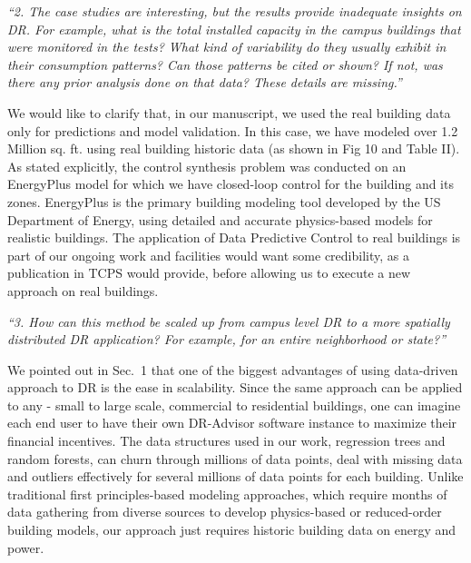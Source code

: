 \documentclass[11pt]{article}
\begin{document}
\vspace*{0.5cm}
\noindent \emph{``2. The case studies are interesting, but the results provide inadequate insights on DR. For example, what is the total installed capacity in the campus buildings that were monitored in the tests? What kind of variability do they usually exhibit in their consumption patterns? Can those patterns be cited or shown? If not, was there any prior analysis done on that data? These details are missing.''}

\color{blue}
\vspace*{0.25cm}
\noindent We would like to clarify that, in our manuscript, we used the real building data only for predictions and model validation. In this case, we have modeled over 1.2 Million sq. ft. using real building historic data (as shown in Fig 10 and Table II). As stated explicitly, the control synthesis problem was conducted on an EnergyPlus model for which we have closed-loop control for the building and its zones. EnergyPlus is the primary building modeling tool developed by the US Department of Energy, using detailed and accurate physics-based models for realistic buildings. The application of Data Predictive Control to real buildings is part of our ongoing work and facilities would want some credibility, as a publication in TCPS would provide, before allowing us to execute a new approach on real buildings. 
\color{black}

\vspace*{0.5cm}
\noindent \emph{``3. How can this method be scaled up from campus level DR to a more spatially distributed DR application? For example, for an entire neighborhood or state?''}

\color{blue}
\vspace*{0.25cm}
\noindent We pointed out in Sec.~1 that one of the biggest advantages of using data-driven approach to DR is the ease in scalability. Since the same approach can be applied to any - small to large scale, commercial to residential buildings, one can imagine each end user to have their own DR-Advisor software instance to maximize their financial incentives. The data structures used in our work, regression trees and random forests, can churn through millions of data points, deal with missing data and outliers effectively for several millions of data points for each building. Unlike traditional first principles-based modeling approaches, which require months of data gathering from diverse sources to develop physics-based or reduced-order building models, our approach just requires historic building data on energy and power.
\color{black}
\end{document}
